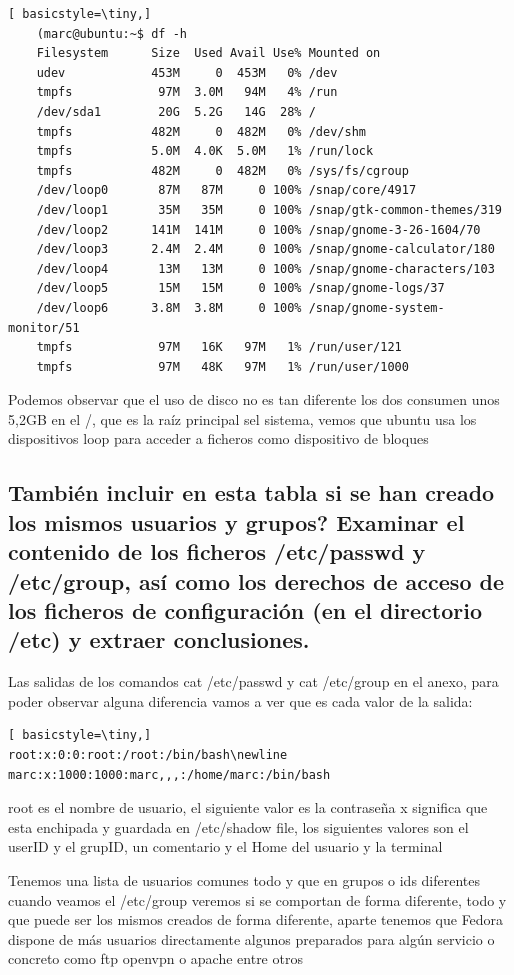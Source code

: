 \documentclass[preprint,11pt]{elsarticle}
\begin{document}
\begin{lstlisting}[ basicstyle=\tiny,]
    (marc@ubuntu:~$ df -h
    Filesystem      Size  Used Avail Use% Mounted on
    udev            453M     0  453M   0% /dev
    tmpfs            97M  3.0M   94M   4% /run
    /dev/sda1        20G  5.2G   14G  28% /
    tmpfs           482M     0  482M   0% /dev/shm
    tmpfs           5.0M  4.0K  5.0M   1% /run/lock
    tmpfs           482M     0  482M   0% /sys/fs/cgroup
    /dev/loop0       87M   87M     0 100% /snap/core/4917
    /dev/loop1       35M   35M     0 100% /snap/gtk-common-themes/319
    /dev/loop2      141M  141M     0 100% /snap/gnome-3-26-1604/70
    /dev/loop3      2.4M  2.4M     0 100% /snap/gnome-calculator/180
    /dev/loop4       13M   13M     0 100% /snap/gnome-characters/103
    /dev/loop5       15M   15M     0 100% /snap/gnome-logs/37
    /dev/loop6      3.8M  3.8M     0 100% /snap/gnome-system-monitor/51
    tmpfs            97M   16K   97M   1% /run/user/121
    tmpfs            97M   48K   97M   1% /run/user/1000

\end{lstlisting}
Podemos observar que el uso de disco no es tan diferente los dos consumen unos 5,2GB en el /, que es la raíz principal sel sistema, vemos que ubuntu usa los dispositivos loop para acceder a ficheros como dispositivo de bloques 

\subsection{También incluir en esta tabla si se han creado los mismos usuarios y grupos? Examinar el contenido de los ficheros /etc/passwd y /etc/group, así como los derechos de acceso de los ficheros de configuración (en el directorio /etc) y extraer conclusiones.}

Las salidas de los comandos cat /etc/passwd y cat /etc/group en el anexo, para poder observar alguna diferencia vamos a ver que es cada valor de la salida:
\begin{lstlisting}[ basicstyle=\tiny,]
root:x:0:0:root:/root:/bin/bash\newline
marc:x:1000:1000:marc,,,:/home/marc:/bin/bash
\end{lstlisting}
root es el nombre de usuario, el siguiente valor es la contraseña x significa que esta enchipada y guardada en /etc/shadow file, los siguientes valores son el userID y el grupID, un comentario y el Home del usuario y la terminal

Tenemos una lista de usuarios comunes todo y que en grupos o ids diferentes cuando veamos el /etc/group veremos si se comportan de forma diferente, todo y que puede ser los mismos creados de forma diferente, aparte tenemos que Fedora dispone de más usuarios directamente algunos preparados para algún servicio o concreto como ftp openvpn o apache entre otros
\end{document}
